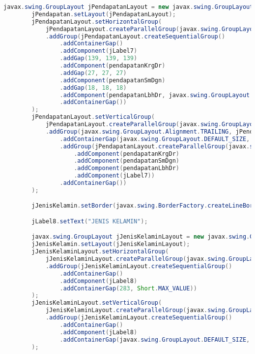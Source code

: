 \begin{lstlisting}[language=Java, caption=TampilanKondisiKetetanggaan.java]
        javax.swing.GroupLayout jPendapatanLayout = new javax.swing.GroupLayout(jPendapatan);
        jPendapatan.setLayout(jPendapatanLayout);
        jPendapatanLayout.setHorizontalGroup(
            jPendapatanLayout.createParallelGroup(javax.swing.GroupLayout.Alignment.LEADING)
            .addGroup(jPendapatanLayout.createSequentialGroup()
                .addContainerGap()
                .addComponent(jLabel7)
                .addGap(139, 139, 139)
                .addComponent(pendapatanKrgDr)
                .addGap(27, 27, 27)
                .addComponent(pendapatanSmDgn)
                .addGap(18, 18, 18)
                .addComponent(pendapatanLbhDr, javax.swing.GroupLayout.DEFAULT_SIZE, javax.swing.GroupLayout.DEFAULT_SIZE, Short.MAX_VALUE)
                .addContainerGap())
        );
        jPendapatanLayout.setVerticalGroup(
            jPendapatanLayout.createParallelGroup(javax.swing.GroupLayout.Alignment.LEADING)
            .addGroup(javax.swing.GroupLayout.Alignment.TRAILING, jPendapatanLayout.createSequentialGroup()
                .addContainerGap(javax.swing.GroupLayout.DEFAULT_SIZE, Short.MAX_VALUE)
                .addGroup(jPendapatanLayout.createParallelGroup(javax.swing.GroupLayout.Alignment.BASELINE)
                    .addComponent(pendapatanKrgDr)
                    .addComponent(pendapatanSmDgn)
                    .addComponent(pendapatanLbhDr)
                    .addComponent(jLabel7))
                .addContainerGap())
        );

        jJenisKelamin.setBorder(javax.swing.BorderFactory.createLineBorder(new java.awt.Color(0, 0, 0)));

        jLabel8.setText("JENIS KELAMIN");

        javax.swing.GroupLayout jJenisKelaminLayout = new javax.swing.GroupLayout(jJenisKelamin);
        jJenisKelamin.setLayout(jJenisKelaminLayout);
        jJenisKelaminLayout.setHorizontalGroup(
            jJenisKelaminLayout.createParallelGroup(javax.swing.GroupLayout.Alignment.LEADING)
            .addGroup(jJenisKelaminLayout.createSequentialGroup()
                .addContainerGap()
                .addComponent(jLabel8)
                .addContainerGap(283, Short.MAX_VALUE))
        );
        jJenisKelaminLayout.setVerticalGroup(
            jJenisKelaminLayout.createParallelGroup(javax.swing.GroupLayout.Alignment.LEADING)
            .addGroup(jJenisKelaminLayout.createSequentialGroup()
                .addContainerGap()
                .addComponent(jLabel8)
                .addContainerGap(javax.swing.GroupLayout.DEFAULT_SIZE, Short.MAX_VALUE))
        );


\end{lstlisting}
